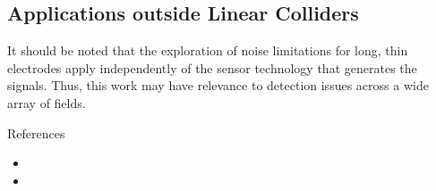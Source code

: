 \subsection{Applications outside Linear Colliders}

It should be noted that the exploration of noise limitations for long, thin electrodes apply independently
of the sensor technology that generates the signals. Thus, this work may have
relevance to detection issues across a wide array of fields.


References
\begin{itemize}
\item {}
\item {}
\end{itemize}
